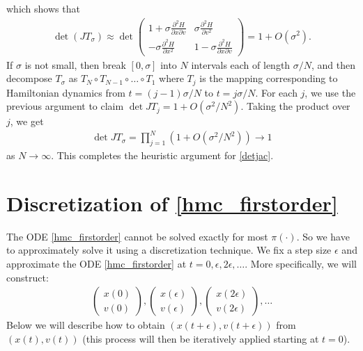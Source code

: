 \documentclass{scrartcl}
\begin{document}
which shows that
\begin{align*}
  \det (J T_{\sigma}) \approx \det   \begin{pmatrix}
1 + \sigma    \frac{\partial^2 H}{\partial x \partial v} &  \sigma\frac{\partial^2
                                                 H}{\partial v^2}  \\ -\sigma\frac{\partial^2
                                                 H}{\partial x^2} & 1 -
                                                                    \sigma
                                                                    \frac{\partial^2
                                                                    H}{\partial
                                                                    x
                                                                    \partial
                                                                    v}
  \end{pmatrix} = 1 + O(\sigma^2). 
\end{align*}
If $\sigma$ is not small, then break $[0, \sigma]$ into $N$ intervals
each of length $\sigma/N$, and then decompose $T_{\sigma}$ as $T_N
\circ T_{N-1} \circ \dots \circ T_1$ where $T_j$ is the mapping
corresponding to Hamiltonian dynamics from $t = (j-1)\sigma/N$ to $t =
j\sigma/N$. For each $j$, we use the previous argument to claim $\det
J T_j = 1 + O(\sigma^2/N^2)$. Taking the product over $j$, we get
\begin{align*}
  \det J T_{\sigma} = \prod_{j=1}^N \left(1 + O(\sigma^2/N^2) \right)
  \rightarrow 1
\end{align*}
as $N \rightarrow \infty$. This completes the heuristic argument for
\eqref{detjac}.

\section{Discretization of \eqref{hmc_firstorder}}

The ODE \eqref{hmc_firstorder} cannot be solved exactly for most
$\pi(\cdot)$. So we have to approximately solve it using a
discretization technique. We fix a step size $\epsilon$ and
approximate the ODE \eqref{hmc_firstorder} at $t = 0, \epsilon, 2
\epsilon, \dots$. More specifically, we will construct:
\begin{align*}
  \begin{pmatrix}
    x(0) \\ v(0)
  \end{pmatrix},
  \begin{pmatrix}
    x(\epsilon) \\ v(\epsilon)
  \end{pmatrix},
  \begin{pmatrix}
    x(2 \epsilon) \\ v(2 \epsilon)
  \end{pmatrix}, \dots
\end{align*}
Below we will describe how to obtain $(x(t+\epsilon), v(t +
\epsilon))$ from $(x(t), v(t))$ (this process will then be iteratively
applied starting at $t = 0$).
\end{document}
